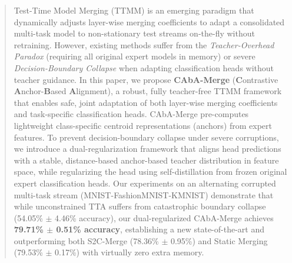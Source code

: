 \documentclass{article}
\theoremstyle{plain}
\theoremstyle{definition}
\theoremstyle{remark}
\begin{document}

\printAffiliationsAndNotice{}  %

\begin{abstract}
Test-Time Model Merging (TTMM) is an emerging paradigm that dynamically adjusts layer-wise merging coefficients to adapt a consolidated multi-task model to non-stationary test streams on-the-fly without retraining. However, existing methods suffer from the \emph{Teacher-Overhead Paradox} (requiring all original expert models in memory) or severe \emph{Decision-Boundary Collapse} when adapting classification heads without teacher guidance. In this paper, we propose \textbf{CAbA-Merge} (\textbf{C}ontrastive \textbf{A}nchor-\textbf{B}ased \textbf{A}lignment), a robust, fully teacher-free TTMM framework that enables safe, joint adaptation of both layer-wise merging coefficients and task-specific classification heads. CAbA-Merge pre-computes lightweight class-specific centroid representations (anchors) from expert features. To prevent decision-boundary collapse under severe corruptions, we introduce a dual-regularization framework that aligns head predictions with a stable, distance-based anchor-based teacher distribution in feature space, while regularizing the head using self-distillation from frozen original expert classification heads. Our experiments on an alternating corrupted multi-task stream (MNIST-FashionMNIST-KMNIST) demonstrate that while unconstrained TTA suffers from catastrophic boundary collapse (54.05\% $\pm$ 4.46\% accuracy), our dual-regularized CAbA-Merge achieves \textbf{79.71\% $\pm$ 0.51\% accuracy}, establishing a new state-of-the-art and outperforming both S2C-Merge (78.36\% $\pm$ 0.95\%) and Static Merging (79.53\% $\pm$ 0.17\%) with virtually zero extra memory.
\end{abstract}
\end{document}
